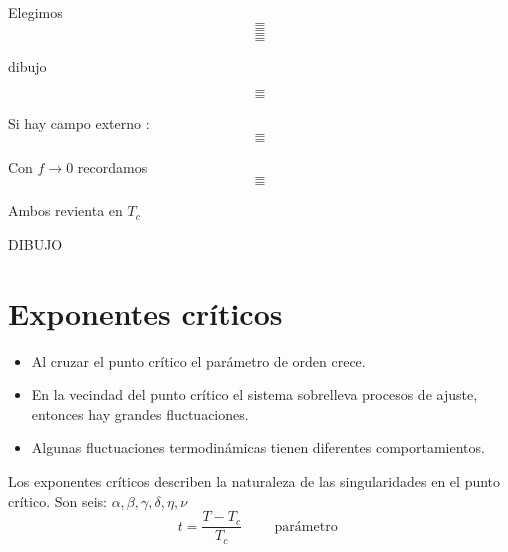\documentclass[10pt,oneside]{CBFT_book}
\begin{document}
Elegimos
\[=\]
\[=\]
\[=\]
\[=\]

dibujo

\[=\]
\[=\]

Si hay campo externo :
\[=\]
\[=\]

Con $f \to 0$ recordamos
\[=\]
\[=\]

Ambos revienta en $T_c$

DIBUJO

\section{Exponentes críticos}

\begin{itemize}
 \item Al cruzar el punto crítico el parámetro de orden crece.
 \item En la vecindad del punto crítico el sistema sobrelleva procesos de ajuste, entonces
 hay grandes fluctuaciones.
 \item Algunas fluctuaciones termodinámicas tienen diferentes comportamientos.
\end{itemize}

Los exponentes críticos describen la naturaleza de las singularidades en el punto crítico.
Son seis: $ \alpha, \beta, \gamma, \delta, \eta, \nu $
\[
	t = \frac{T-T_c}{T_c} \qquad \text{ parámetro } 
\]


\end{document}
